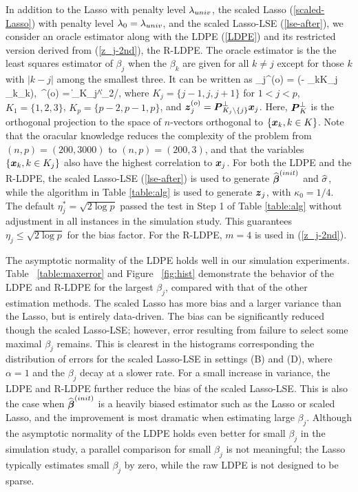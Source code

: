 \documentclass[11pt]{amsart}
\begin{document}
In addition to the Lasso with penalty level $\lambda_{univ}$, the scaled 
Lasso (\ref{scaled-Lasso}) with penalty level $\lambda_0=\lambda_{univ}$, 
and {the scaled Lasso-LSE} (\ref{lse-after}), 
we consider an oracle estimator along with the LDPE  (\ref{LDPE})
and its restricted version derived from (\ref{z_j-2nd}), {the} R-LDPE. 
The oracle estimator is the the least squares estimator of $\beta_j$ 
when {the} $\beta_k$ are given for all $k\neq j$ except for those $k$ with $|k-j|$ 
among the smallest three. It can be written as 
\hbeta_j^{(o)} 
= \Big(\by - \sum_{k\not\in K_j} \bx_k\beta_k\Big),\ 
\hsigma^{(o)} = \|\bP_{K_j}^\perp\bep\|_2/,
\eel
where $K_j=\{j-1,j,j+1\}$ for $1<j<p$, $K_1=\{1,2,3\}$, $K_p=\{p-2,p-1,p\}$, {and}
$\boldsymbol{z}_j^{(o)} = \boldsymbol{P}_{K_j\setminus\{j\}}^\perp\boldsymbol{x}_j$. {Here},
$\boldsymbol{P}_{K}^\perp$ is the orthogonal projection to the space of $n$-vectors orthogonal to $\{\boldsymbol{x}_k, k\in K\}$. 
Note that the oracular knowledge reduces the complexity of the problem from $(n,p)=(200,3000)$ to $(n,p)=(200,3)$, 
and that the variables $\{\boldsymbol{x}_k, k\in K_j\}$ also have the highest correlation to $\boldsymbol{x}_j$. 
For both the LDPE and the {R-LDPE}, 
{the scaled Lasso-LSE} (\ref{lse-after}) is used to generate ${\widehat{\boldsymbol{\beta}}}^{(init)}$ and $\widehat{\sigma}$,
while the algorithm in Table \ref{table:alg} is used to generate $\boldsymbol{z}_j$, with $\kappa_0=1/4$. 
The default $\eta^*_j=\sqrt{2\log p}$ passed the test in Step 1 of Table \ref{table:alg} without adjustment 
in all instances in the simulation study. This guarantees $\eta_j\le \sqrt{2\log p}$ for the bias factor. 
For the {R-LDPE}, $m=4$ is used in (\ref{z_j-2nd}).

The asymptotic normality of the LDPE holds well in our simulation experiments.  
Table ~\ref{table:maxerror} and Figure ~\ref{fig:hist} demonstrate the behavior of the LDPE and {R-LDPE} for 
the largest $\beta_j$, compared with that of the other estimation methods. 
The scaled Lasso has more bias and a larger variance than the Lasso, but is entirely data-driven. 
The bias can be significantly reduced though {the scaled Lasso-LSE}; 
however, error resulting from failure to select some maximal $\beta_j$ remains. 
This is clearest in the histograms corresponding the distribution of errors for {the scaled Lasso-LSE} 
in settings (B) and (D), where $\alpha = 1$ and the $\beta_j$ decay at a slower rate. 
For a small increase in variance, the LDPE and {R-LDPE} further reduce the bias of the {scaled Lasso-LSE}. 
This is also the case 
when ${\widehat{\boldsymbol{\beta}}}^{(init)}$ is a heavily biased estimator such as the Lasso or scaled Lasso, 
and the  improvement is most dramatic when estimating large $\beta_j$. 
Although the asymptotic normality of the LDPE holds even better for small $\beta_j$ in the simulation study, 
a parallel comparison for small $\beta_j$ is not meaningful; the Lasso typically estimates small $\beta_j$ by zero, 
while the raw LDPE is not designed to be sparse. 
\end{document}
